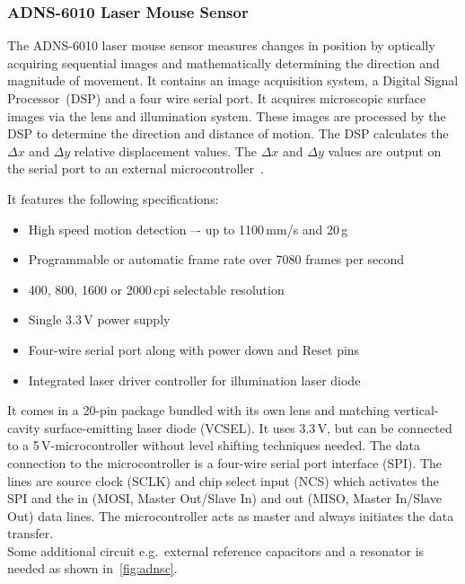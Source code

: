 \documentclass[12pt,a4paper]{article}
\begin{document}
\subsubsection{ADNS-6010 Laser Mouse Sensor}

The ADNS-6010 laser mouse sensor measures changes in position by optically acquiring sequential images and mathematically determining the direction and magnitude of movement.
It contains an image acquisition system, a Digital Signal Processor~(DSP) and a four wire serial port.
It acquires microscopic surface images via the lens and illumination system. 
These images are processed by the DSP to determine the direction and distance of motion. 
The DSP calculates the $\Delta x$ and $\Delta y$ relative displacement values. 
The $\Delta x$ and $\Delta y$ values are output on the serial port to an external microcontroller~\cite{adns}.

 
It features the following specifications:
\begin{itemize}
 \item High speed motion detection –- up to 1100\,mm/s and 20\,g
 \item Programmable or automatic frame rate over 7080 frames per second
 \item 400, 800, 1600 or 2000\,cpi selectable resolution
 \item Single 3.3\,V power supply
 \item Four-wire serial port along with power down and Reset pins
 \item Integrated laser driver controller for illumination laser diode
\end{itemize}

It comes in a 20-pin package bundled with its own lens and matching vertical-cavity surface-emitting laser diode (VCSEL).
It uses 3.3\,V, but can be connected to a 5\,V-microcontroller without level shifting techniques needed.
The data connection to the microcontroller is a four-wire serial port interface (SPI).
The lines are source clock (SCLK) and chip select input (NCS) which activates the SPI and the in (MOSI, Master Out/Slave In) and out (MISO, Master In/Slave Out) data lines.
The microcontroller acts as master and always initiates the data transfer.\\
Some additional circuit e.g.\ external reference capacitors and a resonator is needed as shown in~\autoref{fig:adnsc}.
\end{document}
